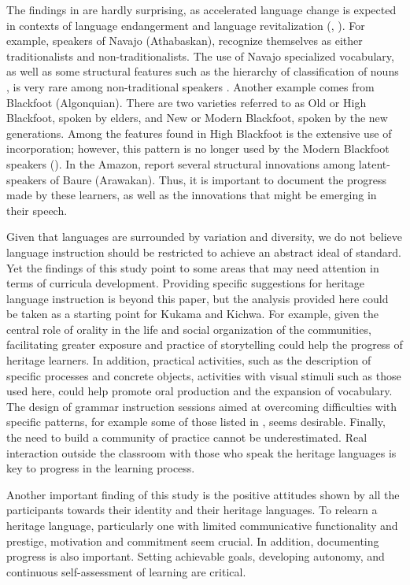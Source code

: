 \documentclass[output=paper]{langscibook}
\begin{document}
The findings in  are hardly surprising, as accelerated language change is expected in contexts of language endangerment and language revitalization (\citealt{Hinton2001}, \citealt{Vallejos2016b}). For example, speakers of Navajo (Athabaskan), recognize themselves as either traditionalists and non-traditionalists. The use of Navajo specialized vocabulary, as well as some structural features such as the hierarchy of classification of nouns \citep{Hale1973}, is very rare among non-traditional speakers \citep{HolmEtAl2003}. Another example comes from Blackfoot (Algonquian). There are two varieties referred to as Old or High Blackfoot, spoken by elders, and New or Modern Blackfoot, spoken by the new generations. Among the features found in High Blackfoot is the extensive use of incorporation; however, this pattern is no longer used by the Modern Blackfoot speakers (\citealt{MiyashitaCrow2006}). In the Amazon, \citet{DanielsenTerhartInReview} report several structural innovations among latent-speakers of Baure (Arawakan). Thus, it is important to document the progress made by these learners, as well as the innovations that might be emerging in their speech.

Given that languages are surrounded by variation and diversity, we do not believe language instruction should be restricted to achieve an abstract ideal of standard. Yet the findings of this study point to some areas that may need attention in terms of curricula development. Providing specific suggestions for heritage language instruction is beyond this paper, but the analysis provided here could be taken as a starting point for Kukama and Kichwa. For example, given the central role of orality in the life and social organization of the communities, facilitating greater exposure and practice of storytelling could help the progress of heritage learners. In addition, practical activities, such as the description of specific processes and concrete objects, activities with visual stimuli such as those used here, could help promote oral production and the expansion of vocabulary. The design of grammar instruction sessions aimed at overcoming difficulties with specific patterns, for example some of those listed in , seems desirable. Finally, the need to build a community of practice cannot be underestimated. Real interaction outside the classroom with those who speak the heritage languages is key to progress in the learning process.

Another important finding of this study is the positive attitudes shown by all the participants towards their identity and their heritage languages. To relearn a heritage language, particularly one with limited communicative functionality and prestige, motivation and commitment seem crucial. In addition, documenting progress is also important. Setting achievable goals, developing autonomy, and continuous self-assessment of learning are critical.
\end{document}
